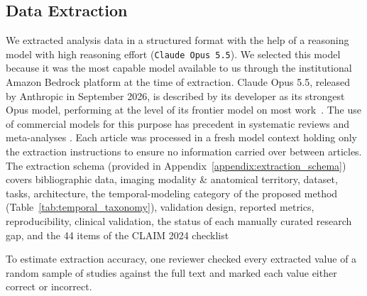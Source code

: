 \subsection{Data Extraction}
\label{sec:full-text-screening}
We extracted analysis data in a structured format with the help of a reasoning model with high reasoning effort (\texttt{Claude Opus 5.5}). We selected this model because it was the most capable model available to us through the institutional Amazon Bedrock platform at the time of extraction. Claude Opus 5.5, released by Anthropic in September 2026, is described by its developer as its strongest Opus model, performing at the level of its frontier model on most work~\cite{anthropic2026opus55}. The use of commercial models for this purpose has precedent in systematic reviews and meta-analyses \cite{konet2024extraction,khan2025collaborative,reason2024automation}. Each article was processed in a fresh model context holding only the extraction instructions to ensure no information carried over between articles. The extraction schema (provided in Appendix~\ref{appendix:extraction_schema}) covers bibliographic data, imaging modality \& anatomical territory, dataset, tasks, architecture, the temporal-modeling category of the proposed method (Table~\ref{tab:temporal_taxonomy}), validation design, reported metrics, reproducibility, clinical validation, the status of each manually curated research gap, and the 44 items of the CLAIM 2024 checklist~\cite{Tejani2024} 


To estimate extraction accuracy, one reviewer checked every extracted value of a random sample of studies against the full text and marked each value either correct or incorrect.


